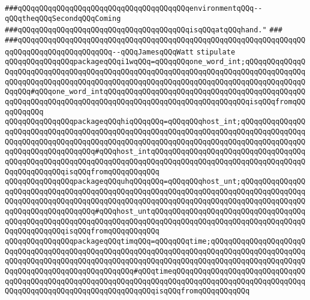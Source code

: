 \verb|###qQQqqQQqqQQqqQQqqQQqqQQqqQQqqQQqqQQqqQQqenvironmentqQQq--qQQqtheqQQqSecondqQQqComing|\newline
\verb|###qQQqqQQqqQQqqQQqqQQqqQQqqQQqqQQqqQQqqQQqisqQQqatqQQqhand."|\newline
\verb|###|\newline
\verb|###qQQqqQQqqQQqqQQqqQQqqQQqqQQqqQQqqQQqqQQqqQQqqQQqqQQqqQQqqQQqqQQqqQQqqQQqqQQqqQQqqQQqqQQqqQQq--qQQqJamesqQQqWatt|\newline
\newline
\newline
\newline
\verb|stipulate|\newline
\verb|qQQqqQQqqQQqqQQqpackageqQQqi1wqQQq=qQQqqQQqone_word_int;qQQqqQQqqQQqqQQqqQQqqQQqqQQqqQQqqQQqqQQqqQQqqQQqqQQqqQQqqQQqqQQqqQQqqQQqqQQqqQQqqQQqqQQqqQQqqQQqqQQqqQQqqQQqqQQqqQQqqQQqqQQqqQQqqQQqqQQqqQQqqQQqqQQqqQQqqQQqqQQq#qQQqone_word_intqQQqqQQqqQQqqQQqqQQqqQQqqQQqqQQqqQQqqQQqqQQqqQQqqQQqqQQqqQQqqQQqqQQqqQQqqQQqqQQqqQQqqQQqqQQqqQQqqQQqqQQqisqQQqfromqQQqqQQqqQQq|\newline
\verb|qQQqqQQqqQQqqQQqpackageqQQqhiqQQqqQQq=qQQqqQQqhost_int;qQQqqQQqqQQqqQQqqQQqqQQqqQQqqQQqqQQqqQQqqQQqqQQqqQQqqQQqqQQqqQQqqQQqqQQqqQQqqQQqqQQqqQQqqQQqqQQqqQQqqQQqqQQqqQQqqQQqqQQqqQQqqQQqqQQqqQQqqQQqqQQqqQQqqQQqqQQqqQQqqQQqqQQqqQQqqQQq#qQQqhost_intqQQqqQQqqQQqqQQqqQQqqQQqqQQqqQQqqQQqqQQqqQQqqQQqqQQqqQQqqQQqqQQqqQQqqQQqqQQqqQQqqQQqqQQqqQQqqQQqqQQqqQQqqQQqqQQqqQQqqQQqisqQQqfromqQQqqQQqqQQq|\newline
\verb|qQQqqQQqqQQqqQQqpackageqQQquhqQQqqQQq=qQQqqQQqhost_unt;qQQqqQQqqQQqqQQqqQQqqQQqqQQqqQQqqQQqqQQqqQQqqQQqqQQqqQQqqQQqqQQqqQQqqQQqqQQqqQQqqQQqqQQqqQQqqQQqqQQqqQQqqQQqqQQqqQQqqQQqqQQqqQQqqQQqqQQqqQQqqQQqqQQqqQQqqQQqqQQqqQQqqQQqqQQqqQQq#qQQqhost_untqQQqqQQqqQQqqQQqqQQqqQQqqQQqqQQqqQQqqQQqqQQqqQQqqQQqqQQqqQQqqQQqqQQqqQQqqQQqqQQqqQQqqQQqqQQqqQQqqQQqqQQqqQQqqQQqqQQqqQQqisqQQqfromqQQqqQQqqQQq|\newline
\verb|qQQqqQQqqQQqqQQqpackageqQQqtimqQQq=qQQqqQQqtime;qQQqqQQqqQQqqQQqqQQqqQQqqQQqqQQqqQQqqQQqqQQqqQQqqQQqqQQqqQQqqQQqqQQqqQQqqQQqqQQqqQQqqQQqqQQqqQQqqQQqqQQqqQQqqQQqqQQqqQQqqQQqqQQqqQQqqQQqqQQqqQQqqQQqqQQqqQQqqQQqqQQqqQQqqQQqqQQqqQQqqQQqqQQqqQQq#qQQqtimeqQQqqQQqqQQqqQQqqQQqqQQqqQQqqQQqqQQqqQQqqQQqqQQqqQQqqQQqqQQqqQQqqQQqqQQqqQQqqQQqqQQqqQQqqQQqqQQqqQQqqQQqqQQqqQQqqQQqqQQqqQQqqQQqqQQqqQQqisqQQqfromqQQqqQQqqQQq|\newline
